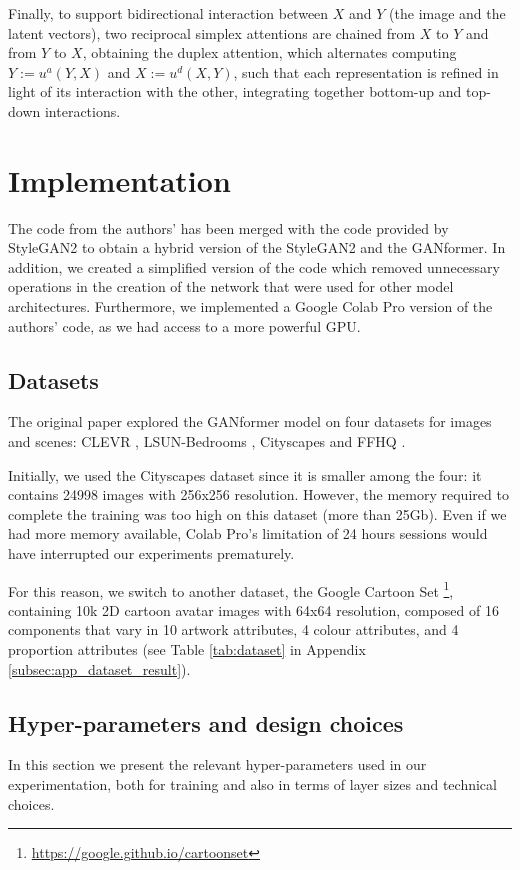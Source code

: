 \documentclass{article}
\begin{document}
	Finally, to support bidirectional interaction between $X$ and $Y$ (the image and the latent vectors), two 
	reciprocal simplex attentions are chained from $X$ to $Y$ and from $Y$ to $X$, obtaining the duplex 
	attention, which alternates computing $Y :=u^a(Y,X)$ and $X:=u^d(X,Y)$, such that each 
	representation is refined in light of its interaction with the other, integrating together bottom-up and 
	top-down interactions.
	
	\section{Implementation}
	The code from the authors' has been merged with the code provided by StyleGAN2 to obtain a 
	hybrid version of the
	StyleGAN2 and the GANformer. In addition, we created a simplified version of the code which 
	removed unnecessary
	operations in the creation of the network that were used for other model architectures. Furthermore, 
	we implemented a Google Colab Pro version of
	the authors’ code, as we had access to a more powerful GPU.
	
	\subsection{Datasets}	\label{sec:dataset}
	The original paper \cite{hudson2021generative} explored the GANformer model on four datasets for 
	images and scenes: CLEVR \cite{johnson2017clevr}, LSUN-Bedrooms \cite{yu2015lsun}, Cityscapes 
	\cite{cordts2016cityscapes} and FFHQ \cite{karras2019style}. 
	
	Initially, we used the Cityscapes dataset since it is smaller among the four: it contains 
	24998 images with 256x256 resolution. 
	However, the memory required to complete the training was too high on this dataset (more than 
	25Gb).
	Even if we had more memory available, Colab Pro's limitation of 24 hours sessions would have 
	interrupted our experiments prematurely.
	
	For this reason, we switch to another dataset, the Google Cartoon Set \cite{cartoonset}\footnote{	
		\url{https://google.github.io/cartoonset}}, containing 10k 2D cartoon avatar 
	images with 64x64 resolution, composed of 16 components that vary in 10 artwork attributes, 4 
	colour attributes, and 4 proportion attributes (see Table \ref{tab:dataset} in Appendix 
	\ref{subsec:app_dataset_result}). 
	
	\subsection{Hyper-parameters and design choices}\label{sec:hyperparam}
	In this section we present the relevant hyper-parameters used in our experimentation, both for 
	training and also in terms of layer sizes and technical choices.
	
\end{document}
